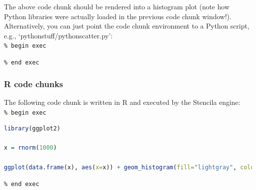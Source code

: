 \documentclass[12pt]{article}
\begin{document}
The above code chunk should be rendered into a histogram plot (note
how Python libraries were actually loaded in the previous code chunk
window!).
Alternatively, you can just point the code chunk environment to a
Python script, e.g., `pythonstuff/pythonscatter.py':\\

\noindent \texttt{\% begin exec}

\noindent \texttt{\% end exec}\\

\subsubsection*{R code chunks}

The following code chunk is written in R and
executed by the Stencila engine:\\

\noindent \texttt{\% begin exec}
\begin{lstlisting}[language=R, breaklines=true, showspaces=false,
  showstringspaces=false, tabsize=4, captionpos=b, frame=single,
  caption={Histogram of 1,000 random draws from $\mathcal{N}$(0.0, 1.0).}]
library(ggplot2)
  
x = rnorm(1000)

ggplot(data.frame(x), aes(x=x)) + geom_histogram(fill="lightgray", color=NA) + theme_classic() + xlab("Random variable x") + ylab("Frequency")
\end{lstlisting}
\noindent  \texttt{\% end exec}
\end{document}
